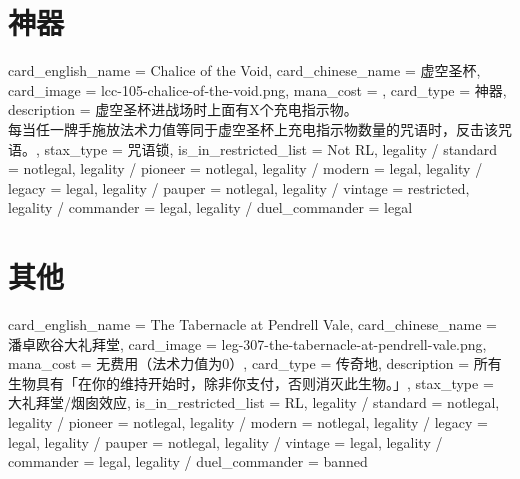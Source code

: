\documentclass[lang = cn, color = black, 10pt]{AllThatStax}
\begin{document}
\section{神器}

\card
{
	card_english_name = {Chalice of the Void},
	card_chinese_name = {虚空圣杯},
	card_image = lcc-105-chalice-of-the-void.png,
	mana_cost = ,
	card_type = 神器,
	description = {虚空圣杯进战场时上面有X个充电指示物。\\
每当任一牌手施放法术力值等同于虚空圣杯上充电指示物数量的咒语时，反击该咒语。},
	stax_type = 咒语锁,
	is_in_restricted_list = Not RL,
	legality / standard = notlegal,
	legality / pioneer = notlegal,
	legality / modern = legal,
	legality / legacy = legal,
	legality / pauper = notlegal,
	legality / vintage = restricted,
	legality / commander = legal,
	legality / duel_commander = legal
}

\section{其他}

\card
{
	card_english_name = {The Tabernacle at Pendrell Vale},
	card_chinese_name = {潘卓欧谷大礼拜堂},
	card_image = leg-307-the-tabernacle-at-pendrell-vale.png,
	mana_cost = 无费用（法术力值为0）,
	card_type = 传奇地,
	description = {所有生物具有「在你的维持开始时，除非你支付，否则消灭此生物。」},
	stax_type = 大礼拜堂/烟囱效应,
	is_in_restricted_list = RL,
	legality / standard = notlegal,
	legality / pioneer = notlegal,
	legality / modern = notlegal,
	legality / legacy = legal,
	legality / pauper = notlegal,
	legality / vintage = legal,
	legality / commander = legal,
	legality / duel_commander = banned
}


\end{document}
